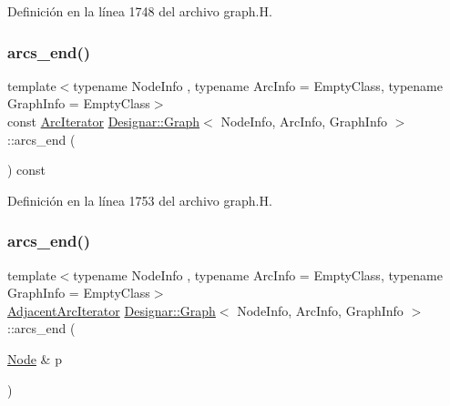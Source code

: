 Definición en la línea 1748 del archivo graph.\+H.

\mbox{\label{class_designar_1_1_graph_a81269c52d854ceb3d000f2642fcb52ae}} 
\subsubsection{\texorpdfstring{arcs\+\_\+end()}{arcs\_end()}\hspace{0.1cm}{\footnotesize\ttfamily [2/4]}}
{\footnotesize\ttfamily template$<$typename Node\+Info , typename Arc\+Info  = Empty\+Class, typename Graph\+Info  = Empty\+Class$>$ \\
const \hyperlink{class_designar_1_1_graph_1_1_arc_iterator}{Arc\+Iterator} \hyperlink{class_designar_1_1_graph}{Designar\+::\+Graph}$<$ Node\+Info, Arc\+Info, Graph\+Info $>$\+::arcs\+\_\+end (\begin{DoxyParamCaption}{ }\end{DoxyParamCaption}) const\hspace{0.3cm}{\ttfamily [inline]}}



Definición en la línea 1753 del archivo graph.\+H.

\mbox{\label{class_designar_1_1_graph_a68ee235ab79790c00e1a69d518b9c076}} 
\subsubsection{\texorpdfstring{arcs\+\_\+end()}{arcs\_end()}\hspace{0.1cm}{\footnotesize\ttfamily [3/4]}}
{\footnotesize\ttfamily template$<$typename Node\+Info , typename Arc\+Info  = Empty\+Class, typename Graph\+Info  = Empty\+Class$>$ \\
\hyperlink{class_designar_1_1_graph_1_1_adjacent_arc_iterator}{Adjacent\+Arc\+Iterator} \hyperlink{class_designar_1_1_graph}{Designar\+::\+Graph}$<$ Node\+Info, Arc\+Info, Graph\+Info $>$\+::arcs\+\_\+end (\begin{DoxyParamCaption}\item[{\hyperlink{class_designar_1_1_graph_a5dfc7dba9d092ac489c72e40390c37d0}{Node} \&}]{p }\end{DoxyParamCaption})\hspace{0.3cm}{\ttfamily [inline]}}



